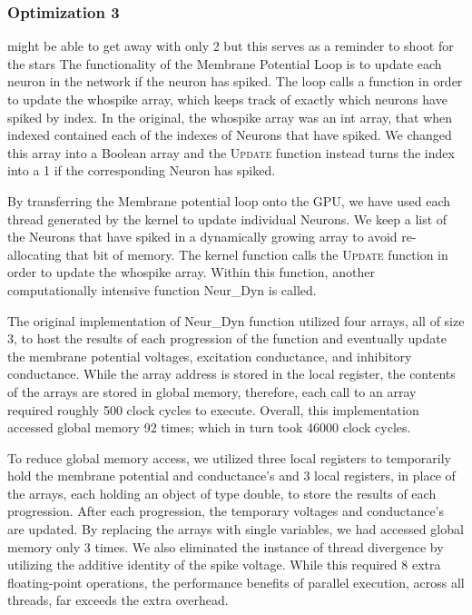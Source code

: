 \documentclass[a4paper]{article}
\begin{document}
\subsubsection{Optimization 3}

{\color{red} might be able to get away with only 2 but this serves as a reminder to shoot for the stars}
The functionality of the Membrane Potential Loop is to update each neuron in the network if the neuron has spiked.  The loop calls a function in order to update the whospike array, which keeps track of exactly which neurons have spiked by index. In the original, the whospike array was an int array, that when indexed contained each of the indexes of Neurons that have spiked. We changed this array into a Boolean array and the \textsc{Update} function instead turns the index into a 1 if the corresponding Neuron has spiked.

By transferring the Membrane potential loop onto the GPU, we have used each thread generated by the kernel to update individual Neurons. We keep a list of the Neurons that have spiked in a dynamically growing array to avoid re-allocating that bit of memory. The kernel function calls the \textsc{Update} function in order to update the whospike array. Within this function, another computationally intensive function Neur_Dyn is called.

The original implementation of Neur_Dyn function utilized four arrays, all of size 3, to host the results of each progression of the function and eventually update the membrane potential voltages, excitation conductance, and inhibitory conductance. While the array address is stored in the local register, the contents of the arrays are stored in global memory, therefore, each call to an array required roughly 500 clock cycles to execute. Overall, this implementation accessed global memory 92 times; which in turn took 46000 clock cycles.

To reduce global memory access, we utilized three local registers to temporarily hold the membrane potential and conductance's and 3 local registers, in place of the arrays, each holding an object of type double, to store the results of each progression. After each progression, the temporary voltages and conductance’s are updated. By replacing the arrays with single variables, we had accessed global memory only 3 times. We also eliminated the instance of thread divergence by utilizing the additive identity of the spike voltage. While this required 8 extra floating-point operations, the performance benefits of parallel execution, across all threads, far exceeds the extra overhead.
\end{document}
